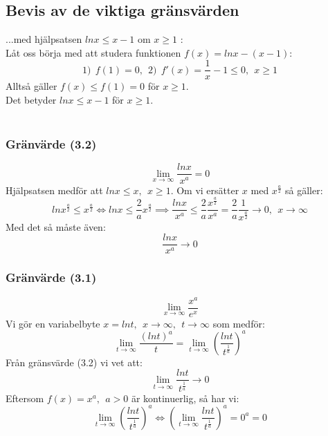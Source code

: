 \documentclass{report}
\begin{document}
\noindent
\subsection{Bevis av de viktiga gränsvärden}
...med hjälpsatsen $ lnx \le x-1 $ om $ x \ge 1 $ :\\
Låt oss börja med att studera funktionen $ f(x) = lnx-(x-1) $:
\begin{equation*}
1)\:\:f(1) = 0,\:\:2)\:\: f'(x) = \frac{1}{x} - 1 \le 0,\:\:x \ge 1
\end{equation*}
Alltså gäller $ f(x) \le f(1) = 0 $ för $ x \ge 1 $.\\
Det betyder $ lnx \le x-1 $ för $ x \ge 1 $.\\\\

\noindent
\subsubsection{Gränvärde (3.2)}
\begin{equation*}
	\lim_{x \to \infty} \frac{lnx}{x^a} = 0
\end{equation*}
Hjälpsatsen medför att $ lnx \le x, \:\: x \ge 1 $. Om vi ersätter $ x $ med $ x^{ \frac{a}{2} } $ så gäller:
\begin{equation*}
	lnx^{ \frac{a}{2} } \le x^{ \frac{a}{2} } \iff lnx \le \frac{2}{a} x^{ \frac{a}{2} } \implies \frac{lnx}{x^a} \le \frac{2}{a}  \frac{x^{ \frac{a}{2} }}{x^a} = \frac{2}{a}  \frac{1}{x^{ \frac{a}{2} }} \to 0,\:\: x \to \infty 
\end{equation*}
Med det så måste även:
\begin{equation*}
\frac{lnx}{x^a}  \to 0
\end{equation*}

\subsubsection{Gränvärde (3.1)}
\begin{equation*}
\lim_{x \to \infty} \frac{x^a}{e^x} 
\end{equation*}
Vi gör en variabelbyte $ x = lnt,\:\:x \to \infty,\:\: t \to \infty$ som medför:
\begin{equation*}
	\lim_{t \to \infty} \frac{(lnt)^a}{t} = \lim_{t \to \infty} ( \frac{lnt}{t^{ \frac{1}{a} }}  )^a
\end{equation*}
\noindent
Från gränsvärde (3.2) vi vet att:
\begin{equation*}
	\lim_{t \to \infty} \frac{lnt}{t^{ \frac{1}{a} }} \to 0
\end{equation*}
\noindent
Eftersom $ f(x) = x^a,\:\: a > 0 $ är kontinuerlig, så har vi:
\begin{equation*}
	\lim_{t \to \infty} ( \frac{lnt}{t^{ \frac{1}{a} }}  )^a \iff ( \lim_{t \to \infty} \frac{lnt}{t^ { \frac{1}{a} }}  )^a = 0^a = 0
\end{equation*}
\end{document}
